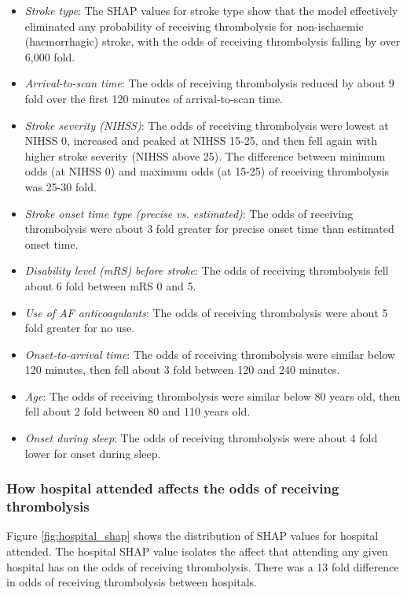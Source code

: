 \begin{itemize}
    \item \emph{Stroke type}: The SHAP values for stroke type show that the model effectively eliminated any probability of receiving thrombolysis for non-ischaemic (haemorrhagic) stroke, with the odds of receiving thrombolysis falling by over 6,000 fold.
    \item \emph{Arrival-to-scan time}: The odds of receiving thrombolysis reduced by about 9 fold over the first 120 minutes of arrival-to-scan time.
    \item \emph{Stroke severity (NIHSS)}: The odds of receiving thrombolysis were lowest at NIHSS 0, increased and peaked at NIHSS 15-25, and then fell again with higher stroke severity (NIHSS above 25). The difference between minimum odds (at NIHSS 0) and maximum odds (at 15-25) of receiving thrombolysis was 25-30 fold.
    \item \emph{Stroke onset time type (precise vs. estimated)}: The odds of receiving thrombolysis were about 3 fold greater for precise onset time than estimated onset time.
    \item \emph{Disability level (mRS) before stroke}: The odds of receiving thrombolysis fell about 6 fold between mRS 0 and 5.
    \item \emph{Use of AF anticoagulants}: The odds of receiving thrombolysis were about 5 fold greater for no use.
    \item \emph{Onset-to-arrival time}: The odds of receiving thrombolysis were similar below 120 minutes, then fell about 3 fold between 120 and 240 minutes.
    \item \emph{Age}: The odds of receiving thrombolysis were similar below 80 years old, then fell about 2 fold between 80 and 110 years old.    
    \item \emph{Onset during sleep}: The odds of receiving thrombolysis were about 4 fold lower for onset during sleep.
\end{itemize}

\subsubsection{How hospital attended affects the odds of receiving thrombolysis}

Figure \ref{fig:hospital_shap} shows the distribution of SHAP values for hospital attended. The hospital SHAP value isolates the affect that attending any given hospital has on the odds of receiving thrombolysis. There was a 13 fold difference in odds of receiving thrombolysis between hospitals.

